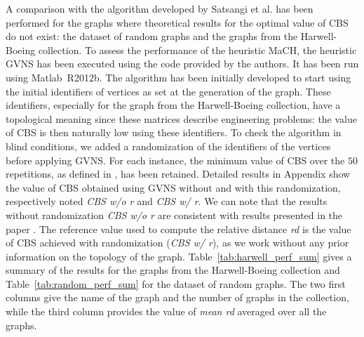 \documentclass{scrartcl}
\theoremstyle{plain}
\newcommand{\algo}{MaCH}
\newcommand{\gvns}{GVNS}
\newcommand{\cbs}{CBS}
\begin{document}
A comparison with the algorithm developed by Satsangi et al. \cite{Satsangi2012} 
has been performed for the graphs where theoretical results for the optimal 
value of \cbs{} do not exist: the dataset of random graphs and the graphs from 
the Harwell-Boeing collection. To assess the performance of the heuristic 
\algo{}, the heuristic \gvns{} \cite{Satsangi2012} has been executed using the 
code provided by the authors. It has been run using Matlab~R2012b. The algorithm 
has been initially developed to start using the initial identifiers of vertices 
as set at the generation of the graph. These identifiers, especially for the 
graph from the Harwell-Boeing collection, have a topological meaning since these 
matrices describe engineering problems: the value of \cbs{} is then naturally 
low using these identifiers. To check the algorithm in blind conditions, we 
added a randomization of the identifiers of the vertices before applying 
\gvns{}. For each instance, the minimum value of \cbs{} over the $50$ 
repetitions, as defined in \cite{Satsangi2012}, has been retained. Detailed 
results in Appendix show the value of \cbs{} obtained using \gvns{} without and 
with this randomization, respectively noted \emph{\cbs{} w/o r} and \emph{\cbs{} 
w/ r}. We can note that the results without randomization \emph{\cbs{} w/o r} 
are consistent with results presented in the paper \cite{Satsangi2012}. The 
reference value used to compute the relative distance \emph{rd} is the value of 
\cbs{} achieved with randomization (\emph{\cbs{} w/ r}), as we work without any 
prior information on the topology of the graph. Table~\ref{tab:harwell_perf_sum} 
gives a summary of the results for the graphs from the Harwell-Boeing collection 
and Table~\ref{tab:random_perf_sum} for the dataset of random graphs. The two 
first columns give the name of the graph and the number of graphs in the 
collection, while the third column provides the value of \emph{mean rd} averaged 
over all the graphs.
\end{document}
